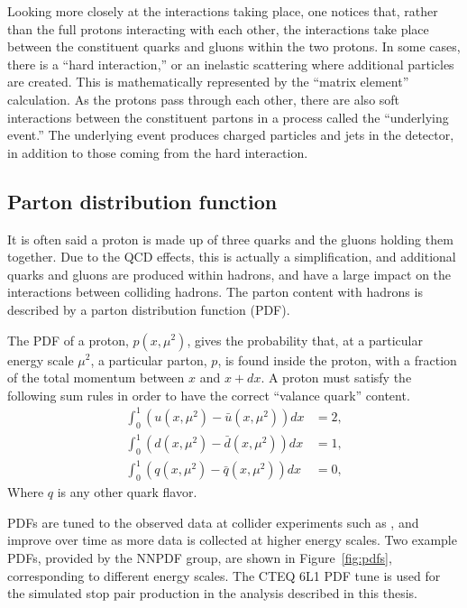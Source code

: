 Looking more closely at the interactions taking place, one notices that,
rather than the full protons interacting with each other, the interactions
take place between the constituent quarks and gluons within the two protons.
In some cases, there is a ``hard interaction,'' or an inelastic scattering
where additional particles are created.
This is mathematically represented by the ``matrix element'' calculation.
As the protons pass through each other, there are also soft interactions
between the constituent partons in a process called the ``underlying event.''
The underlying event produces charged particles and jets in the detector, in
addition to those coming from the hard interaction.

\FloatBarrier
\subsection{Parton distribution function}
\label{sec:pdf}

It is often said a proton is made up of three quarks and the gluons holding
them together.
Due to the QCD effects, this is actually a simplification, and additional
quarks and gluons are produced within hadrons, and have a large impact 
on the interactions between colliding hadrons.
The parton content with hadrons is described by a parton distribution
function (PDF).

The PDF of a proton, $p(x, \mu^2)$, gives the probability that, at a particular
energy scale $\mu^2$, a particular parton, $p$, is found inside the proton, with
a fraction of the total momentum between $x$ and $x+dx$.
A proton must satisfy the following sum rules in order to have the correct
``valance quark'' content.
\begin{align}
  \int_0^1 \left( u(x, \mu^2) - \bar{u}(x, \mu^2) \right) dx & = 2, \\
  \int_0^1 \left( d(x, \mu^2) - \bar{d}(x, \mu^2) \right) dx & = 1, \\
  \int_0^1 \left( q(x, \mu^2) - \bar{q}(x, \mu^2) \right) dx & = 0,
\end{align}
Where $q$ is any other quark flavor.

PDFs are tuned to the observed data at collider experiments such as \ATLAS,
and improve over time as more data is collected at higher energy scales.
Two example PDFs, provided by the NNPDF group, are shown in
Figure~\ref{fig:pdfs}, corresponding to different energy scales.
The CTEQ 6L1 PDF tune is used for the simulated stop pair production in the
analysis described in this thesis.

